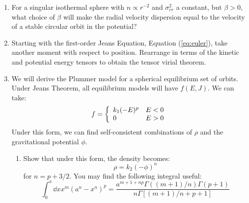 \begin{enumerate}
\item For a singular isothermal sphere with $n\propto r^{-2}$ and
$\sigma_{rr}^2$ a constant, but $\beta > 0$, what choice of $\beta$
will make the radial velocity dispersion equal to the 
velocity of a stable circular orbit in the potential?
\item Starting with the first-order Jeans Equation,
Equation (\ref{eq:euler}), take another moment with respect to
position. Rearrange in terms of the kinetic and potential energy
tensors to obtain the tensor virial theorem.
\item We will derive the Plummer model for a spherical equilibrium set
of orbits. Under Jeans Theorem, all equilibrium models will have
$f(E,J)$.  We can take:
\begin{equation}
f = \left\{ \begin{array}{ll}
k_1 (-E)^p & E<0 \cr
0 & E>0 \end{array} \right.
\end{equation}
Under this form, we can find self-consistent combinations of $\rho$
and the gravitational potential $\phi$.
\begin{enumerate}
\item Show that under this form, the density becomes:
\begin{equation}
\rho = k_2 \left(-\phi\right)^n
\end{equation}
for $n=p+3/2$. You may find the following integral useful:
\begin{equation}
\int_0^a {\dd x} x^m \left(a^n - x^n\right)^p =
\frac{a^{m+1+np} \Gamma\left((m+1)/n\right) \Gamma\left(p+1\right)}
{n \Gamma\left[(m+1)/n +p + 1\right]}
\end{equation}


\end{enumerate}
\end{enumerate}
